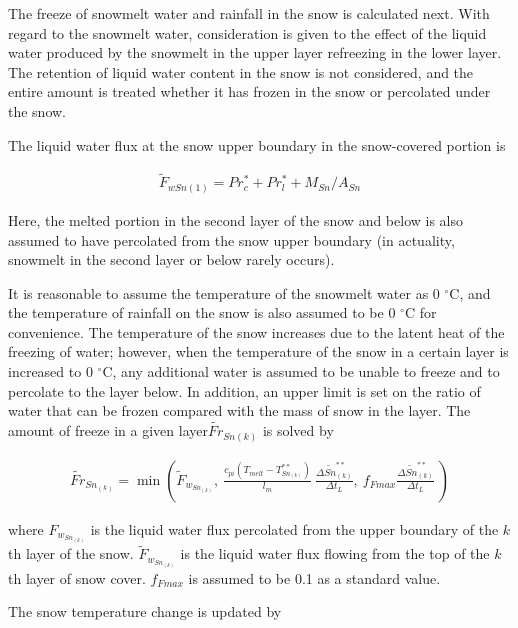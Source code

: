 The freeze of snowmelt water and rainfall in the snow is calculated next. With regard to the snowmelt water, consideration is given to the effect of the liquid water produced by the snowmelt in the
upper layer refreezing in the lower layer. The retention of liquid water content in the snow is not considered, and the entire amount is treated whether it has frozen in the snow or percolated under
the snow.

The liquid water flux at the snow upper boundary in the snow-covered portion is

\begin{eqnarray}
\widetilde{F}_{wSn(1)} = Pr_c^{\ast} + Pr_l^{\ast} + M_{Sn} / A_{Sn} \label{8-23}
\end{eqnarray}

Here, the melted portion in the second layer of the snow and below is also assumed to have percolated from the snow upper boundary (in actuality, snowmelt in the second layer or below rarely occurs).

It is reasonable to assume the temperature of the snowmelt water as 0 \(^\circ\mathrm{C}\), and the temperature of rainfall on the snow is also assumed to be 0 \(^\circ\mathrm{C}\) for convenience.
The temperature of the snow increases due to the latent heat of the freezing of water; however, when the temperature of the snow in a certain layer is increased to 0 \(^\circ\mathrm{C}\), any
additional water is assumed to be unable to freeze and to percolate to the layer below. In addition, an upper limit is set on the ratio of water that can be frozen compared with the mass of snow in
the layer. The amount of freeze in a given layer\(\widetilde{Fr}_{Sn(k)}\) is solved by

\begin{eqnarray}
\widetilde{Fr}_{Sn_{(k)}} = \min\left(
\widetilde{F}_{w_{Sn_{(k)}}}, \
\frac{c_{pi}(T_{melt}-T_{Sn_{(k)}}^{\ast\ast})}{l_m} \
\frac{\Delta \widetilde{Sn}_{(k)}^{\ast\ast}}{\Delta t_L} , \
f_{Fmax}\frac{\Delta \widetilde{Sn}_{(k)}^{\ast\ast}}{\Delta t_L} \
\right) \label{8-24}
\end{eqnarray}

where \(F_{w_{Sn_{(k)}}}\) is the liquid water flux percolated from the upper boundary of the \(k\)th layer of the snow. \(\widetilde{F}_{w_{Sn_{(k)}}}\) is the liquid water flux flowing from the top
of the \(k\)th layer of snow cover. \(f_{Fmax}\) is assumed to be 0.1 as a standard value.

The snow temperature change is updated by

